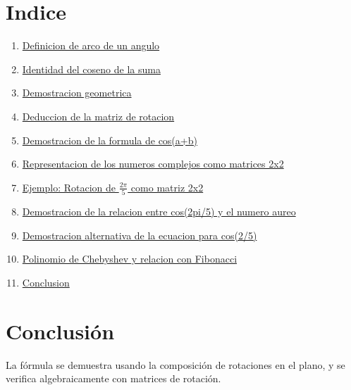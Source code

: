 \documentclass{article}
\begin{document}
\section*{Indice}
\begin{enumerate}
  \item \hyperref[sec:arco]{Definicion de arco de un angulo}
  \item \hyperref[sec:identidad]{Identidad del coseno de la suma}
  \item \hyperref[sec:geom]{Demostracion geometrica}
  \item \hyperref[sec:rotacion]{Deduccion de la matriz de rotacion}
  \item \hyperref[sec:demcos]{Demostracion de la formula de cos(a+b)}
  \item \hyperref[sec:complejos]{Representacion de los numeros complejos como matrices 2x2}
  \item \hyperref[sec:ejemplo]{Ejemplo: Rotacion de $\frac{2\pi}{5}$ como matriz 2x2}
  \item \hyperref[sec:cosenoaureo]{Demostracion de la relacion entre cos(2pi/5) y el numero aureo}
  \item \hyperref[sec:demostracion_alternativa]{Demostracion alternativa de la ecuacion para cos(2\pi/5)}
  \item \hyperref[sec:chebfib]{Polinomio de Chebyshev y relacion con Fibonacci}
  \item \hyperref[sec:conclusion]{Conclusion}
\end{enumerate}


\pagecolor{carne}

\newpage

\pagecolor{white}

\newpage

\pagecolor{carne}

\newpage

\pagecolor{white}

\newpage

\pagecolor{carne}

\newpage

\pagecolor{white}

\newpage

\pagecolor{carne}

\newpage

\pagecolor{white}

\newpage

\pagecolor{carne}

\newpage

\pagecolor{white}

\newpage

\pagecolor{white}
\section{Conclusión}\label{sec:conclusion}
La fórmula se demuestra usando la composición de rotaciones en el plano, y se verifica algebraicamente con matrices de rotación.
\end{document}
